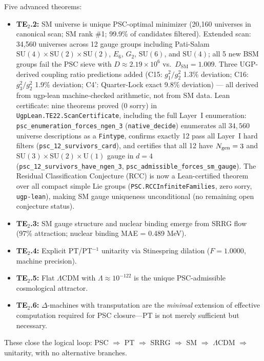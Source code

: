 \documentclass[11pt]{article}
\begin{document}
Five advanced theorems:
\begin{itemize}[nosep]
\item \textbf{TE$_2$.2:} SM universe is unique PSC-optimal minimizer (20,160 universes in canonical scan; SM rank \#1; 99.9\% of candidates filtered). Extended scan: 34,560 universes across 12 gauge groups including Pati-Salam $\mathrm{SU}(4)\times\mathrm{SU}(2)\times\mathrm{SU}(2)$, $E_6$, $G_2$, $\mathrm{SU}(6)$, and $\mathrm{SU}(4)$; all 5 new BSM groups fail the PSC sieve with $D\approx 2.19\times 10^6$ vs.\ $D_{\mathrm{SM}}=1.009$. Three UGP-derived coupling ratio predictions added (C15: $g_1^2/g_2^2$ 1.3\% deviation; C16: $g_3^2/g_2^2$ 1.9\% deviation; C4': Quarter-Lock exact 9.8\% deviation) — all derived from ugp-lean machine-checked arithmetic, not from SM data. Lean certificate: nine theorems proved (0 sorry) in \texttt{UgpLean.TE22.ScanCertificate}, including the full Layer~I enumeration: \texttt{psc\_enumeration\_forces\_ngen\_3} (\texttt{native\_decide}) enumerates all $34{,}560$ universe descriptions as a \texttt{Fintype}, confirms exactly 12 pass all Layer~I hard filters (\texttt{psc\_12\_survivors\_card}), and certifies that all 12 have $N_{\rm gen}=3$ and $\mathrm{SU}(3)\times\mathrm{SU}(2)\times\mathrm{U}(1)$ gauge in $d=4$ (\texttt{psc\_12\_survivors\_have\_ngen\_3}, \texttt{psc\_admissible\_forces\_sm\_gauge}). The Residual Classification Conjecture (RCC) is now a Lean-certified theorem over all compact simple Lie groups (\texttt{PSC.RCCInfiniteFamilies}, zero sorry, \texttt{ugp-lean}), making SM gauge uniqueness unconditional (no remaining open conjecture status).
\item \textbf{TE$_2$.3:} SM gauge structure and nuclear binding emerge from SRRG flow (97\% attraction; nuclear binding MAE = 0.489 MeV).
\item \textbf{TE$_2$.4:} Explicit PT/PT$^{-1}$ unitarity via Stinespring dilation ($F=1.0000$, machine precision).
\item \textbf{TE$_2$.5:} Flat $\Lambda$CDM with $\Lambda\approx10^{-122}$ is the unique PSC-admissible cosmological attractor.
\item \textbf{TE$_2$.6:} $\Delta$-machines with transputation are the \emph{minimal} extension of effective computation required for PSC closure---PT is not merely sufficient but necessary.
\end{itemize}
These close the logical loop: PSC $\Rightarrow$ PT $\Rightarrow$ SRRG $\Rightarrow$ SM $\Rightarrow$ $\Lambda$CDM $\Rightarrow$ unitarity, with no alternative branches.
\end{document}
